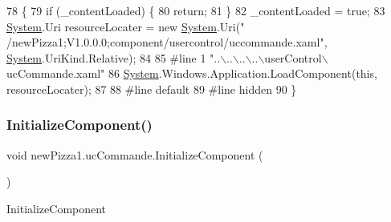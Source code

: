 \begin{DoxyCode}
78                                           \{
79             \textcolor{keywordflow}{if} (\_contentLoaded) \{
80                 \textcolor{keywordflow}{return};
81             \}
82             \_contentLoaded = \textcolor{keyword}{true};
83             \hyperlink{namespaceSystem}{System}.Uri resourceLocater = \textcolor{keyword}{new} \hyperlink{namespaceSystem}{System}.Uri(\textcolor{stringliteral}{"
      /newPizza1;V1.0.0.0;component/usercontrol/uccommande.xaml"}, \hyperlink{namespaceSystem}{System}.UriKind.Relative);
84             
85 \textcolor{preprocessor}{            #line 1 "..\(\backslash\)..\(\backslash\)..\(\backslash\)..\(\backslash\)userControl\(\backslash\)ucCommande.xaml"}
86             \hyperlink{namespaceSystem}{System}.Windows.Application.LoadComponent(\textcolor{keyword}{this}, resourceLocater);
87             
88 \textcolor{preprocessor}{            #line default}
89 \textcolor{preprocessor}{            #line hidden}
90         \}
\end{DoxyCode}
\mbox{\label{classnewPizza1_1_1ucCommande_a3f6251cc87dd9f2a2db45c5413ce1711}} 
\subsubsection{\texorpdfstring{Initialize\+Component()}{InitializeComponent()}\hspace{0.1cm}{\footnotesize\ttfamily [3/6]}}
{\footnotesize\ttfamily void new\+Pizza1.\+uc\+Commande.\+Initialize\+Component (\begin{DoxyParamCaption}{ }\end{DoxyParamCaption})\hspace{0.3cm}{\ttfamily [inline]}}



Initialize\+Component 


